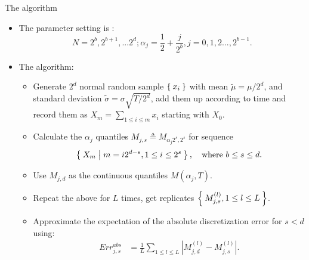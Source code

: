 \documentclass[cjk,10pt]{beamer}
\def\tmu{{\widetilde{\mu}}}
\def\tsigma{{\widetilde{\sigma}}}
\def\abs#1{{\left|#1\right|}}
\begin{document}
\begin{frame}{The algorithm}
\small
\begin{itemize}
\item 
The parameter setting is : 
\begin{equation}
 N = 2^b , 2^{b+1} , ... 2^{d}; 
\alpha_j =  \frac{1}{2} + \frac{j}{2^b} , j = 0, 1 , 2..., 2^{b-1}.
\end{equation}
\item
The algorithm: 
\begin{itemize}
\item Generate $2^{d}$ normal random sample $\Set{x_i}$ 
  with mean $\tmu=\mu/2^d$,
  and standard deviation $\tsigma = \sigma \sqrt {{T}/{2^d}}$,
  add them up according to time and record them as
  $X_m = \sum_{1\leq i \leq m} x_i$ starting with $X_0$.
\item Calculate the $\alpha_j$ quantiles 
  $M_{j,s}\triangleq M_{\alpha_j 2^s,2^s}$ for sequence 
  \[
  \Set{X_m|m=i 2^{d-s}, 1\leq i\leq 2^{s}},\quad \text{where }b\leq s \leq d.\] 
\item Use $M_{j,d}$ as the continuous quantiles $M(\alpha_j,T)$.
\item Repeat the above for $L$ times,
  get replicates $\Set{M_{j,s}^{(l)},{1\leq l\leq L}}$.
\item Approximate the expectation of the absolute discretization error for $s < d$ using:
\begin{align}
Err^{abs}_{j,s} &= \frac{1}{L}\sum_{1\leq l \leq L} \abs{M_{j,d}^{(l)}- M_{j,s}^{(l)}}.
\end{align}
\end{itemize}
\end{itemize}
\end{frame}

%
\end{document}
